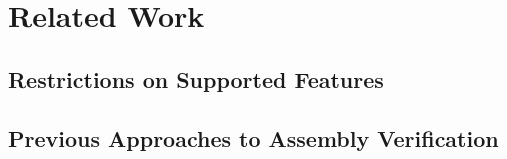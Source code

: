 \chapter{Related Work}
\section{Restrictions on Supported Features}
\section{Previous Approaches to Assembly Verification}
